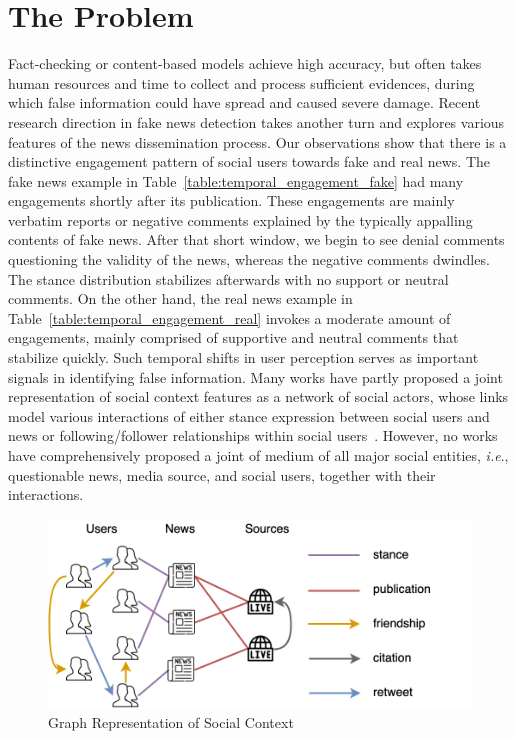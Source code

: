 \documentclass[fyp]{socreport}
\theoremstyle{definition}
\theoremstyle{hypothesis}
\begin{document}
\section{The Problem}
Fact-checking or content-based models achieve high accuracy, but often takes human resources and time to collect and process sufficient evidences, during which false information could have spread and caused severe damage. Recent research direction 
in fake news detection takes another turn and explores various features of the news dissemination process. Our observations show that there is a distinctive engagement pattern of social users towards fake and real news. 
The fake news example in Table~\ref{table:temporal_engagement_fake} had many engagements shortly after its publication. These engagements are mainly verbatim reports or negative comments explained by the typically appalling contents of fake news. After that short window, we begin to see denial comments questioning the validity of the news, whereas the negative comments dwindles. The stance distribution stabilizes afterwards with no support or neutral comments. On the other hand, the real news example in Table~\ref{table:temporal_engagement_real} invokes a moderate amount of engagements, mainly comprised of supportive and neutral comments that stabilize quickly. Such temporal shifts in user perception serves as important signals in identifying false information. Many works have partly proposed a joint representation of social context features as a network of social actors, whose links model various interactions of either stance expression between social users and news or following/follower relationships within social users~\cite{jin2014news,gupta2012evaluating,popat2017truth,shu2019beyond}. However, no works have comprehensively proposed a joint of medium of all major social entities, \textit{i.e}., questionable news, media source, and social users, together with their interactions. 

\begin{figure}[t]
\centering
\includegraphics[scale=0.5]{social_graph_final.png}
\caption{Graph Representation of Social Context}
\label{fig:social_graph}
\end{figure}
\end{document}
